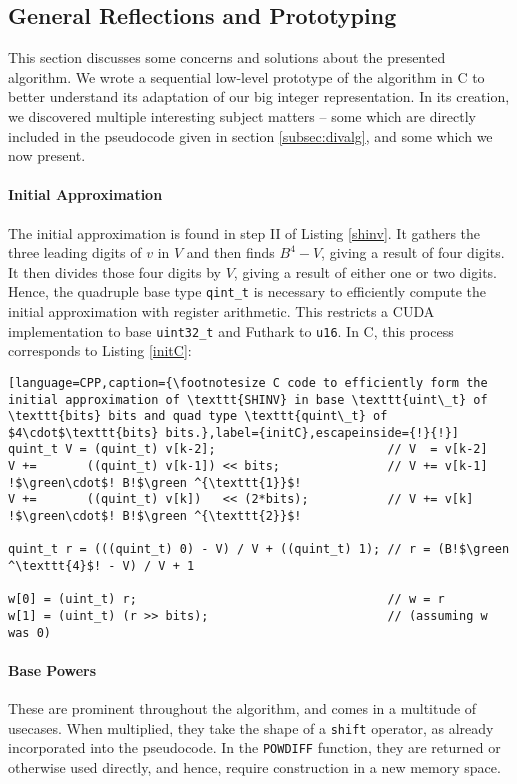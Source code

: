 \subsection{General Reflections and Prototyping}
\label{subsec:divproto}

This section discusses some concerns and solutions about the presented
algorithm. We wrote a sequential low-level prototype of the algorithm in C to
better understand its adaptation of our big integer representation. In its
creation, we discovered multiple interesting subject matters -- some which are
directly included in the pseudocode given in section \ref{subsec:divalg}, and
some which we now present.

\paragraph{Initial Approximation}
The initial approximation is found in step II of Listing \ref{shinv}. It gathers
the three leading digits of $v$ in $V$ and then finds $B^4-V$, giving a result
of four digits. It then divides those four digits by $V$, giving a result of
either one or two digits. Hence, the quadruple base type \texttt{qint\_t} is
necessary to efficiently compute the initial approximation with register
arithmetic. This restricts a CUDA implementation to base \texttt{uint32\_t} and
Futhark to \texttt{u16}. In C, this process corresponds to Listing \ref{initC}:
\begin{lstlisting}[language=CPP,caption={\footnotesize C code to efficiently form the initial approximation of \texttt{SHINV} in base \texttt{uint\_t} of \texttt{bits} bits and quad type \texttt{quint\_t} of $4\cdot$\texttt{bits} bits.},label={initC},escapeinside={!}{!}]
quint_t V = (quint_t) v[k-2];                        // V  = v[k-2]
V +=       ((quint_t) v[k-1]) << bits;               // V += v[k-1] !$\green\cdot$! B!$\green ^{\texttt{1}}$!
V +=       ((quint_t) v[k])   << (2*bits);           // V += v[k]   !$\green\cdot$! B!$\green ^{\texttt{2}}$!

quint_t r = (((quint_t) 0) - V) / V + ((quint_t) 1); // r = (B!$\green ^\texttt{4}$! - V) / V + 1

w[0] = (uint_t) r;                                   // w = r 
w[1] = (uint_t) (r >> bits);                         // (assuming w was 0)
\end{lstlisting}

\paragraph{Base Powers}
These are prominent throughout the algorithm, and comes in a multitude of
usecases. When multiplied, they take the shape of a \texttt{shift} operator, as
already incorporated into the pseudocode. In the \texttt{POWDIFF} function, they
are returned or otherwise used directly, and hence, require construction in a
new memory space.


